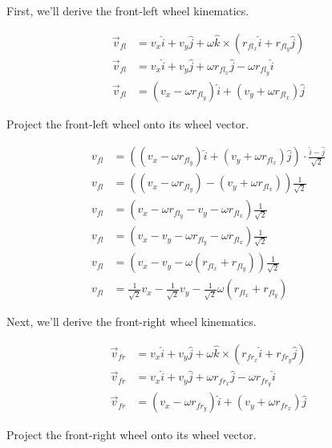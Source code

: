 First, we'll derive the front-left wheel kinematics.

\begin{align*}
  \vec{v}_{fl} &= v_x \hat{i} + v_y \hat{j} +
    \omega \hat{k} \times (r_{fl_x} \hat{i} + r_{fl_y} \hat{j}) \\
  \vec{v}_{fl} &= v_x \hat{i} + v_y \hat{j} +
    \omega r_{fl_x} \hat{j} - \omega r_{fl_y} \hat{i} \\
  \vec{v}_{fl} &= (v_x - \omega r_{fl_y}) \hat{i} +
    (v_y + \omega r_{fl_x}) \hat{j}
\end{align*}

Project the front-left wheel onto its wheel vector.

\begin{align}
  v_{fl} &= ((v_x - \omega r_{fl_y}) \hat{i} + (v_y + \omega r_{fl_x}) \hat{j})
    \cdot \frac{\hat{i} - \hat{j}}{\sqrt{2}} \nonumber \\
  v_{fl} &= ((v_x - \omega r_{fl_y}) - (v_y + \omega r_{fl_x}))
    \frac{1}{\sqrt{2}} \nonumber \\
  v_{fl} &= (v_x - \omega r_{fl_y} - v_y - \omega r_{fl_x})
    \frac{1}{\sqrt{2}} \nonumber \\
  v_{fl} &= (v_x - v_y - \omega r_{fl_y} - \omega r_{fl_x})
    \frac{1}{\sqrt{2}} \nonumber \\
  v_{fl} &= (v_x - v_y - \omega (r_{fl_x} + r_{fl_y}))
    \frac{1}{\sqrt{2}} \nonumber \\
  v_{fl} &= \frac{1}{\sqrt{2}} v_x - \frac{1}{\sqrt{2}} v_y -
    \frac{1}{\sqrt{2}} \omega (r_{fl_x} + r_{fl_y})
\end{align}

Next, we'll derive the front-right wheel kinematics.

\begin{align*}
  \vec{v}_{fr} &= v_x \hat{i} + v_y \hat{j} +
    \omega \hat{k} \times (r_{fr_x} \hat{i} + r_{fr_y} \hat{j}) \\
  \vec{v}_{fr} &= v_x \hat{i} + v_y \hat{j} +
    \omega r_{fr_x} \hat{j} - \omega r_{fr_y} \hat{i} \\
  \vec{v}_{fr} &= (v_x - \omega r_{fr_y}) \hat{i} +
    (v_y + \omega r_{fr_x}) \hat{j}
\end{align*}

Project the front-right wheel onto its wheel vector.

